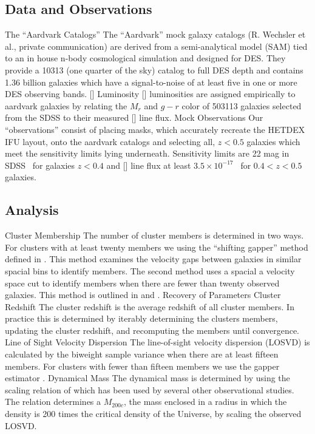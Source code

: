 \documentclass[12pt]{article}
\begin{document}
\subsection{Data and Observations}
\begin{outline}[enumerate]
	\1 The ``Aardvark Catalogs''
		\2 The ``Aardvark'' mock galaxy catalogs (R. Wechsler et al., private communication) are derived from a semi-analytical model (SAM) tied to an in house n-body cosmological simulation and designed for DES. They provide a 10313 \degsq (one quarter of the sky) catalog to full DES depth and contains 1.36 billion galaxies which have a signal-to-noise of at least five in one or more DES observing bands.
	\1 {\rm[]} Luminosity
		\2 {\rm[]} luminosities are assigned empirically to aardvark galaxies by relating the $M_r$ and $g-r$ color of 503113 galaxies selected from the SDSS to their measured [] line flux.
	\1 Mock Observations
		\2 Our ``observations'' consist of placing masks, which accurately recreate the HETDEX IFU layout, onto the aardvark catalogs and selecting all, $z< 0.5$ galaxies which meet the sensitivity limits lying underneath.
		\2 Sensitivity limits are 22 mag in SDSS \sdssg\ for galaxies $z<0.4$ and [] line flux at least $3.5\times10^{-17}$ \ergscm\ for $0.4<z<0.5$ galaxies.
\end{outline}

\subsection{Analysis}
\begin{outline}[enumerate]
	\1 Cluster Membership
		\2 The number of cluster members is determined in two ways. For clusters with at least twenty members we using the ``shifting gapper'' method defined in \cite{Fadda1996}. This method examines the velocity gaps between galaxies in similar spacial bins to identify members. The second method uses a spacial a velocity space cut to identify members when there are fewer than twenty observed galaxies. This method is outlined in \cite{Connelly2012} and \cite{Wilman2005}.
	\1 Recovery of Parameters
		\2 Cluster Redshift
			\3 The cluster redshift is the average redshift of all cluster members. In practice this is determined by iterably determining the clusters members, updating the cluster redshift, and recomputing the members until convergence.  
		\2 Line of Sight Velocity Dispersion
			\3 The line-of-sight velocity dispersion (LOSVD) is calculated by the biweight sample variance \citep{Ruel2014} when there are at least fifteen members. For clusters with fewer than fifteen members we use the gapper estimator \citep{Beers1990}.
		\2 Dynamical Mass
			\3 The dynamical mass is determined by using the scaling relation of \cite{Munari2013} which has been used by several other observational studies. The relation determines a $M_{200c}$, the mass enclosed in a radius in which the density is 200 times the critical density of the Universe, by scaling the observed LOSVD.
\end{outline}
\end{document}
